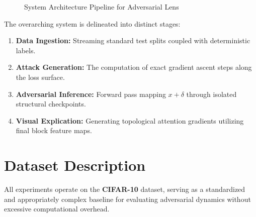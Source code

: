 \documentclass[12pt,a4paper]{article}
\begin{document}
\begin{figure}[H]
\centering
{}
\caption{System Architecture Pipeline for Adversarial Lens}
\label{fig:sys_overview}
\end{figure}

The overarching system is delineated into distinct stages:
\begin{enumerate}
    \item \textbf{Data Ingestion:} Streaming standard test splits coupled with deterministic labels.
    \item \textbf{Attack Generation:} The computation of exact gradient ascent steps along the loss surface.
    \item \textbf{Adversarial Inference:} Forward pass mapping $x+\delta$ through isolated structural checkpoints.
    \item \textbf{Visual Explication:} Generating topological attention gradients utilizing final block feature maps.
\end{enumerate}

\section{Dataset Description}
All experiments operate on the \textbf{CIFAR-10} dataset, serving as a standardized and appropriately complex baseline for evaluating adversarial dynamics without excessive computational overhead.
\end{document}
